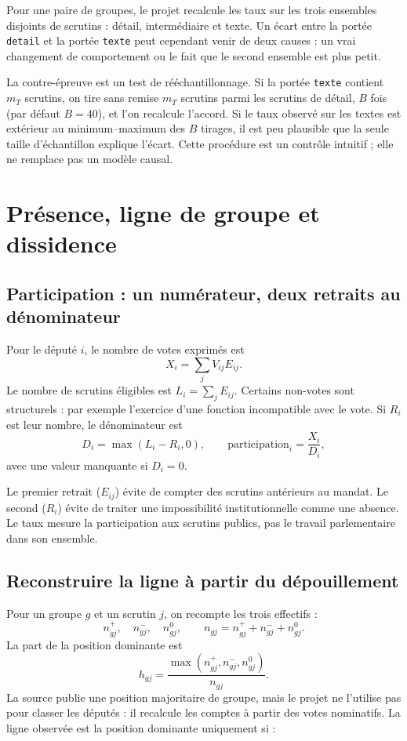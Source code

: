 \documentclass[11pt,a4paper]{article}
\newcommand{\code}[1]{\texttt{#1}}
\begin{document}
Pour une paire de groupes, le projet recalcule les taux sur les trois ensembles
disjoints de scrutins : détail, intermédiaire et texte. Un écart entre la portée
\code{detail} et la portée \code{texte} peut cependant venir de deux causes :
un vrai changement de comportement ou le fait que le second ensemble est plus
petit.

La contre-épreuve est un test de rééchantillonnage. Si la portée \code{texte}
contient $m_T$ scrutins, on tire sans remise $m_T$ scrutins parmi les scrutins de
détail, $B$ fois (par défaut $B=40$), et l'on recalcule l'accord. Si le taux
observé sur les textes est extérieur au minimum--maximum des $B$ tirages, il est
peu plausible que la seule taille d'échantillon explique l'écart. Cette procédure
est un contrôle intuitif ; elle ne remplace pas un modèle causal.

\section{Présence, ligne de groupe et dissidence}

\subsection{Participation : un numérateur, deux retraits au dénominateur}

Pour le député $i$, le nombre de votes exprimés est
\[
 X_i=\sum_j V_{ij}E_{ij}.
\]
Le nombre de scrutins éligibles est $L_i=\sum_jE_{ij}$. Certains non-votes sont
structurels : par exemple l'exercice d'une fonction incompatible avec le vote.
Si $R_i$ est leur nombre, le dénominateur est
\[
 D_i=\max(L_i-R_i,0),
 \qquad \mathrm{participation}_i=\frac{X_i}{D_i},
\]
avec une valeur manquante si $D_i=0$.

Le premier retrait ($E_{ij}$) évite de compter des scrutins antérieurs au
mandat. Le second ($R_i$) évite de traiter une impossibilité institutionnelle
comme une absence. Le taux mesure la participation aux scrutins publics, pas
le travail parlementaire dans son ensemble.

\subsection{Reconstruire la ligne à partir du dépouillement}

Pour un groupe $g$ et un scrutin $j$, on recompte les trois effectifs :
\[
 n^+_{gj},\quad n^-_{gj},\quad n^0_{gj},\qquad
 n_{gj}=n^+_{gj}+n^-_{gj}+n^0_{gj}.
\]
La part de la position dominante est
\[
 h_{gj}=\frac{\max(n^+_{gj},n^-_{gj},n^0_{gj})}{n_{gj}}.
\]
La source publie une position majoritaire de groupe, mais le projet ne l'utilise
pas pour classer les députés : il recalcule les comptes à partir des votes
nominatifs. La ligne observée est la position dominante uniquement si :
\end{document}

